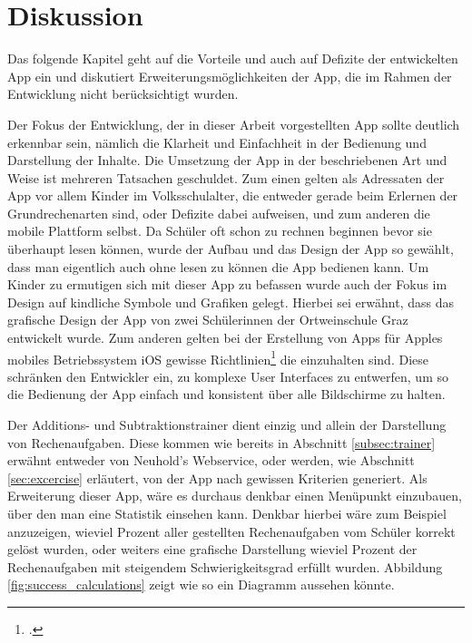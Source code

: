 
\chapter{Diskussion}
\label{chap:disc}

Das folgende Kapitel geht auf die Vorteile und auch auf Defizite der entwickelten App ein und diskutiert
Erweiterungsmöglichkeiten der App, die im Rahmen der Entwicklung nicht berücksichtigt wurden. 

Der Fokus der Entwicklung, der in dieser Arbeit vorgestellten App sollte deutlich erkennbar sein, nämlich
die Klarheit und Einfachheit in der Bedienung und Darstellung der Inhalte. Die Umsetzung der App in der 
beschriebenen Art und Weise ist mehreren Tatsachen geschuldet. Zum einen gelten als Adressaten der 
App vor allem Kinder im Volksschulalter, die entweder gerade beim Erlernen der Grundrechenarten sind,
oder Defizite dabei aufweisen, und zum anderen die mobile Plattform selbst. Da Schüler oft schon zu 
rechnen beginnen bevor sie überhaupt lesen können, wurde der Aufbau und das Design der App so gewählt,
dass man eigentlich auch ohne lesen zu können die App bedienen kann. Um Kinder zu ermutigen sich mit 
dieser App zu befassen wurde auch der Fokus im Design auf kindliche Symbole und Grafiken gelegt. 
Hierbei sei erwähnt, dass das grafische Design der App von zwei Schülerinnen der Ortweinschule Graz entwickelt wurde.
Zum anderen gelten bei der Erstellung von Apps für Apples mobiles Betriebssystem iOS gewisse 
Richtlinien\footcite{https://developer.apple.com/library/ios/documentation/userexperience/conceptual/mobilehig/}
die einzuhalten sind. Diese schränken den Entwickler ein, zu komplexe User Interfaces zu entwerfen, 
um so die Bedienung der App einfach und konsistent über alle Bildschirme zu halten.

Der Additions- und Subtraktionstrainer dient einzig und allein der Darstellung von Rechenaufgaben. Diese
kommen wie bereits in Abschnitt \ref{subsec:trainer} erwähnt entweder von Neuhold's Webservice, oder
werden, wie Abschnitt \ref{sec:excercise} erläutert, von der App nach gewissen Kriterien generiert.
Als Erweiterung dieser App, wäre es durchaus denkbar einen Menüpunkt einzubauen, über den
man eine Statistik einsehen kann. Denkbar hierbei wäre zum Beispiel anzuzeigen, wieviel Prozent 
aller gestellten Rechenaufgaben vom Schüler korrekt gelöst wurden, oder weiters eine grafische
Darstellung wieviel Prozent der Rechenaufgaben mit steigendem Schwierigkeitsgrad erfüllt wurden. 
Abbildung \ref{fig:success_calculations} zeigt wie so ein Diagramm aussehen könnte.

